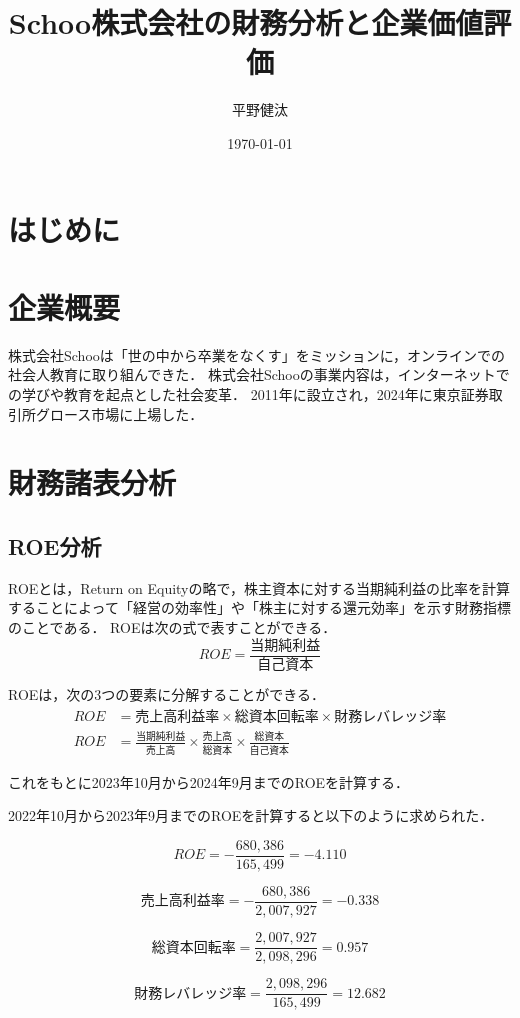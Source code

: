 \documentclass[a4paper]{ltjsarticle}
\begin{document}
\title{Schoo株式会社の財務分析と企業価値評価}
\author{平野健汰}
\date{\today}

\maketitle

\section{はじめに}

\section{企業概要}
株式会社Schooは「世の中から卒業をなくす」をミッションに，オンラインでの社会人教育に取り組んできた．
株式会社Schooの事業内容は，インターネットでの学びや教育を起点とした社会変革．
2011年に設立され，2024年に東京証券取引所グロース市場に上場した．

\section{財務諸表分析}
\subsection{ROE分析}
ROEとは，Return on Equityの略で，株主資本に対する当期純利益の比率を計算することによって「経営の効率性」や「株主に対する還元効率」を示す財務指標のことである．
ROEは次の式で表すことができる．
\[
ROE = \frac{当期純利益}{自己資本}
\]

ROEは，次の3つの要素に分解することができる．
\begin{align*}
ROE &= 売上高利益率 \times 総資本回転率 \times 財務レバレッジ率 \\
ROE &= \frac{当期純利益}{売上高} \times \frac{売上高}{総資本} \times \frac{総資本}{自己資本}
\end{align*}

これをもとに2023年10月から2024年9月までのROEを計算する．

2022年10月から2023年9月までのROEを計算すると以下のように求められた．

\[
ROE = -\frac{680,386}{165,499} = -4.110
\]

\[
売上高利益率 = -\frac{680,386}{2,007,927} = -0.338
\]

\[
総資本回転率 = \frac{2,007,927}{2,098,296} = 0.957
\]

\[
財務レバレッジ率 = \frac{2,098,296}{165,499} = 12.682
\]
\end{document}
